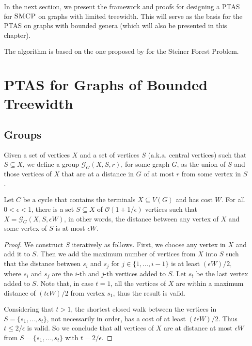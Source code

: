 In the next section, we present the framework and proofs for designing a PTAS for \(\textsc{SMCP}\) on graphs with limited treewidth. This will serve as the basis for the PTAS on graphs with bounded genera (which will also be presented in this chapter).

The algorithm is based on the one proposed by \cite{Bateni} for the Steiner Forest Problem.

\section{PTAS for Graphs of Bounded Treewidth}
\label{section:ptas_bounded_tree}

\subsection{Groups}

Given a set of vertices \(X\) and a set of vertices \(S\) (a.k.a. central vertices) such that \(S \subseteq X\), we define a group \(\mathcal{G}_G(X, S, r)\), for some graph \(G\), as the union of \(S\) and those vertices of \(X\) that are at a distance in \(G\) of at most \(r\) from some vertex in \(S\).

\begin{lemma} \label{groupLemma}
Let \(C\) be a cycle that contains the terminals \(X \subseteq V(G)\) and has cost \(W\). For all \(0 < \epsilon < 1\), there is a set \(S \subseteq X\) of \(\mathcal{O}(1 + 1/\epsilon)\) vertices such that \(X = \mathcal{G}_G(X, S, \epsilon W)\), in other words, the distance between any vertex of \(X\) and some vertex of \(S\) is at most \(\epsilon W\).
\end{lemma}
\begin{proof}

We construct \(S\) iteratively as follows. 
First, we choose any vertex in \(X\) and add it to \(S\). Then we add the maximum number of vertices from \(X\) into \(S\) such that the distance between \(s_i\) and \(s_j\) for \(j \in \{1, \dots, i-1\}\) is at least \((\epsilon W)/2\), where $s_i$ and $s_j$ are the $i$-th and $j$-th vertices added to $S$. Let \(s_t\) be the last vertex added to \(S\). Note that, in case \(t = 1\), all the vertices of \(X\) are within a maximum distance of \((t \epsilon W)/2\) from vertex \(s_1\), thus the result is valid.

Considering that \(t > 1\), the shortest closed walk between the vertices in \(S = \{s_1, \dots, s_t\}\), not necessarily in order, has a cost of at least \((t \epsilon W)/2\). Thus \(t \leq 2/\epsilon\) is valid. So we conclude that all vertices of \(X\) are at distance at most \(\epsilon W\) from \(S = \{s_1, \dots, s_t\}\) with \(t = 2/\epsilon\).
\end{proof}

